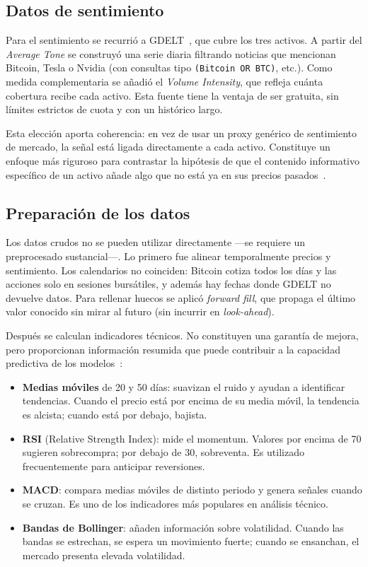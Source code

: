\subsection{Datos de sentimiento}

Para el sentimiento se recurrió a GDELT~\cite{gdelt2024api}, que cubre los tres activos. A partir del \textit{Average Tone} se construyó una serie diaria filtrando noticias que mencionan Bitcoin, Tesla o Nvidia (con consultas tipo \texttt{(Bitcoin OR BTC)}, etc.). Como medida complementaria se añadió el \textit{Volume Intensity}, que refleja cuánta cobertura recibe cada activo. Esta fuente tiene la ventaja de ser gratuita, sin límites estrictos de cuota y con un histórico largo.

Esta elección aporta coherencia: en vez de usar un proxy genérico de sentimiento de mercado, la señal está ligada directamente a cada activo. Constituye un enfoque más riguroso para contrastar la hipótesis de que el contenido informativo específico de un activo añade algo que no está ya en sus precios pasados~\cite{baker2007investor}.

\subsection{Preparación de los datos}

Los datos crudos no se pueden utilizar directamente ---se requiere un preprocesado sustancial---. Lo primero fue alinear temporalmente precios y sentimiento. Los calendarios no coinciden: Bitcoin cotiza todos los días y las acciones solo en sesiones bursátiles, y además hay fechas donde GDELT no devuelve datos. Para rellenar huecos se aplicó \textit{forward fill}, que propaga el último valor conocido sin mirar al futuro (sin incurrir en \textit{look-ahead}).

Después se calculan indicadores técnicos. No constituyen una garantía de mejora, pero proporcionan información resumida que puede contribuir a la capacidad predictiva de los modelos~\cite{murphy1999technical}:

\begin{itemize}
    \item \textbf{Medias móviles} de 20 y 50 días: suavizan el ruido y ayudan a identificar tendencias. Cuando el precio está por encima de su media móvil, la tendencia es alcista; cuando está por debajo, bajista.
    
    \item \textbf{RSI} (Relative Strength Index): mide el momentum. Valores por encima de 70 sugieren sobrecompra; por debajo de 30, sobreventa. Es utilizado frecuentemente para anticipar reversiones.
    
    \item \textbf{MACD}: compara medias móviles de distinto periodo y genera señales cuando se cruzan. Es uno de los indicadores más populares en análisis técnico.
    
    \item \textbf{Bandas de Bollinger}: añaden información sobre volatilidad. Cuando las bandas se estrechan, se espera un movimiento fuerte; cuando se ensanchan, el mercado presenta elevada volatilidad.
\end{itemize}

